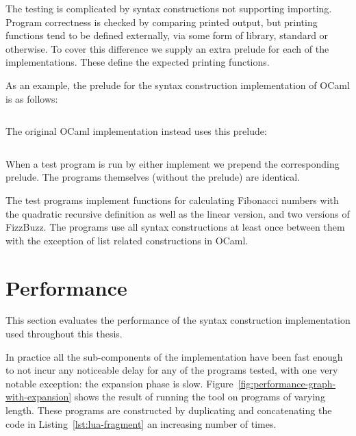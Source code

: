 \documentclass{kththesis}
\begin{document}
The testing is complicated by syntax constructions not supporting importing. Program correctness is checked by comparing printed output, but printing functions tend to be defined externally, via some form of library, standard or otherwise. To cover this difference we supply an extra prelude for each of the implementations. These define the expected printing functions.

As an example, the prelude for the syntax construction implementation of OCaml is as follows:

\inputminted{ocaml}{implementation/languages/ocaml/fake-prelude}

The original OCaml implementation instead uses this prelude:

\inputminted{ocaml}{implementation/languages/ocaml/real-prelude}

When a test program is run by either implement we prepend the corresponding prelude. The programs themselves (without the prelude) are identical.

The test programs implement functions for calculating Fibonacci numbers with the quadratic recursive definition as well as the linear version, and two versions of FizzBuzz. The programs use all syntax constructions at least once between them with the exception of list related constructions in OCaml.

\section{Performance} \label{sec:performance}

This section evaluates the performance of the syntax construction implementation used throughout this thesis.

In practice all the sub-components of the implementation have been fast enough to not incur any noticeable delay for any of the programs tested, with one very notable exception: the expansion phase is slow. Figure~\ref{fig:performance-graph-with-expansion} shows the result of running the tool on programs of varying length. These programs are constructed by duplicating and concatenating the code in Listing~\ref{lst:lua-fragment} an increasing number of times.
\end{document}

